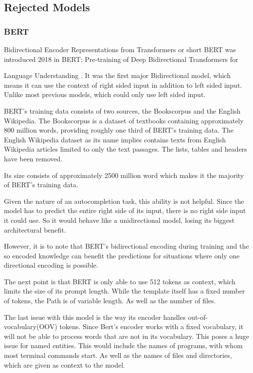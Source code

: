 \subsection{Rejected Models}


\subsubsection{BERT}

Bidirectional Encoder Representations from Transformers or short BERT was introduced  2018  in BERT: Pre-training of Deep Bidirectional Transformers for

Language Understanding \cite{devlin2019bert}. It was the first major Bidirectional model, which means it can use the context of right sided input in addition to left sided input. Unlike most previous models, which could only use left sided input.


 

 BERT's training data consists of two sources, the Bookscorpus and the English Wikipedia. The Bookscorpus is a dataset of textbooks containing approximately 800 million words, providing roughly one third of BERT's training data. The English Wikipedia dataset as its name implies contains texts from English Wikipedia articles limited to only the text passages. The lists, tables and headers have been removed.

Its size consists of approximately 2500 million word which makes it the majority of BERT's training data. \cite{devlin2019bert}



 Given the nature of an autocompletion task, this ability is not helpful. Since the model has to predict the entire right side of its input, there is no right side input it could use. So it would behave like a unidirectional model, losing its biggest architectural benefit.

 

However, it is to note that BERT's bidirectional encoding during training and the so encoded knowledge can benefit the predictions  for situations where only one directional encoding is possible.


The next point is that BERT is only able to use 512 tokens as context, which limits the size of its prompt length. While the template itself has a fixed number of tokens, the Path is of variable length. As well as the number of files.



The last issue with this model is the way its encoder handles out-of-vocabulary(OOV) tokens. Since Bert's encoder works with a fixed vocabulary, it will not be able to process words that are not in its vocabulary. This poses a huge issue for named entities. This would include the names of programs, with whom most terminal commands start. As well as the names of files and directories, which are given as context to the model. 



